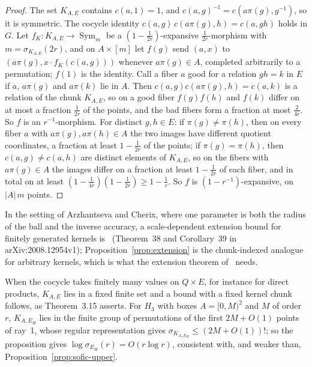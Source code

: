 \documentclass[11pt,a4paper]{article}
\theoremstyle{plain}
\theoremstyle{definition}
\theoremstyle{remark}
\DeclareMathOperator{\Sym}{Sym}
\begin{document}
\begin{proof}
The set $K_{A,E}$ contains $c(a,1)=1$, and $c(a,g)^{-1}=c(a\pi(g),g^{-1})$, so it is symmetric. The cocycle identity
$c(a,g)\,c(a\pi(g),h)=c(a,gh)$ holds in $G$. Let $f_K:K_{A,E}\to\Sym_m$ be a $(1-\frac1{2r})$-expansive $\frac1{2r}$-morphism with $m=\sigma_{K_{A,E}}(2r)$, and
on $A\times[m]$ let $f(g)$ send $(a,x)$ to $(a\pi(g),x\cdot f_K(c(a,g)))$ whenever $a\pi(g)\in A$, completed arbitrarily to a permutation; $f(1)$ is the
identity. Call a fiber $a$ good for a relation $gh=k$ in $E$ if $a$, $a\pi(g)$ and $a\pi(k)$ lie in $A$. Then $c(a,g)c(a\pi(g),h)=c(a,k)$ is a relation of the
chunk $K_{A,E}$, so on a good fiber $f(g)f(h)$ and $f(k)$ differ on at most a fraction $\frac1{2r}$ of the points, and the bad fibers form a fraction at
most $\frac2{4r}$. So $f$ is an $r^{-1}$-morphism. For distinct $g,h\in E$: if $\pi(g)\ne\pi(h)$, then on every fiber $a$ with $a\pi(g),a\pi(h)\in A$ the
two images have different quotient coordinates, a fraction at least $1-\frac1{2r}$ of the points; if $\pi(g)=\pi(h)$, then $c(a,g)\ne c(a,h)$ are distinct
elements of $K_{A,E}$, so on the fibers with $a\pi(g)\in A$ the images differ on a fraction at least $1-\frac1{2r}$ of each fiber, and in total on at least
$(1-\frac1{4r})(1-\frac1{2r})\ge1-\frac1r$. So $f$ is $(1-r^{-1})$-expansive, on $|A|\,m$ points.
\end{proof}

In the setting of Arzhantseva and Cherix, where one parameter is both the radius of the ball and the inverse accuracy, a scale-dependent
extension bound for finitely generated kernels is~\cite[Theorem~5.5 and Corollary~5.6]{ArzhantsevaCherix2020} (Theorem~38 and
Corollary~39 in arXiv:2008.12954v1); Proposition~\ref{prop:extension} is the chunk-indexed analogue for arbitrary kernels, which is what
the extension theorem of~\cite{Cornulier2013} needs.

When the cocycle takes finitely many values on $Q\times E$, for instance for direct products, $K_{A,E}$ lies in a fixed finite set and a bound with a
fixed kernel chunk follows, as Theorem~3.15 asserts. For $H_3$ with boxes $A=[0,M)^2$ and $M$ of order $r$, $K_{A,E_H}$ lies in the finite group of
permutations of the first $2M+O(1)$ points of ray~1, whose regular representation gives $\sigma_{K_{A,E_H}}\le(2M+O(1))!$; so the proposition gives
$\log\sigma_{E_H}(r)=O(r\log r)$, consistent with, and weaker than, Proposition~\ref{prop:sofic-upper}.
\end{document}
